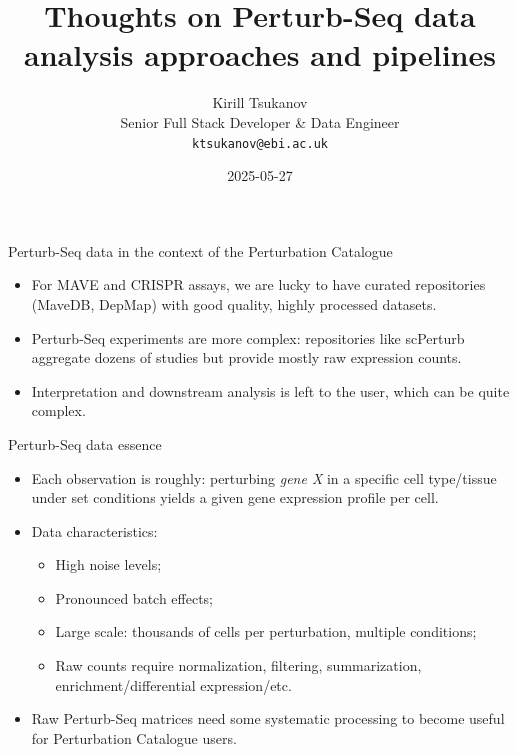 \documentclass[handout]{beamer}
\title{Thoughts on Perturb-Seq data analysis approaches and pipelines}
\date{2025-05-27}
\author{Kirill Tsukanov \\ Senior Full Stack Developer \& Data Engineer \\ \texttt{ktsukanov@ebi.ac.uk}}
\institute{Perturbation Catalogue All-Hands Meeting}
\begin{document}
\begin{frame}
    \titlepage
\end{frame}

\begin{frame}{Perturb-Seq data in the context of the Perturbation Catalogue}
    \begin{itemize}
        \item For MAVE and CRISPR assays, we are lucky to have curated repositories (MaveDB, DepMap) with good quality, highly processed datasets.
        \item Perturb-Seq experiments are more complex: repositories like scPerturb aggregate dozens of studies but provide mostly raw expression counts.
        \item Interpretation and downstream analysis is left to the user, which can be quite complex.
    \end{itemize}
\end{frame}

\begin{frame}{Perturb-Seq data essence}
    \begin{itemize}
        \item Each observation is roughly: perturbing \emph{gene X} in a specific cell type/tissue under set conditions yields a given gene expression profile per cell.
        \item Data characteristics:
        \begin{itemize}
            \item High noise levels;
            \item Pronounced batch effects;
            \item Large scale: thousands of cells per perturbation, multiple conditions;
            \item Raw counts require normalization, filtering, summarization, enrichment/differential expression/etc.
        \end{itemize}
        \item Raw Perturb-Seq matrices need some systematic processing to become useful for Perturbation Catalogue users.
    \end{itemize}
\end{frame}
\end{document}
